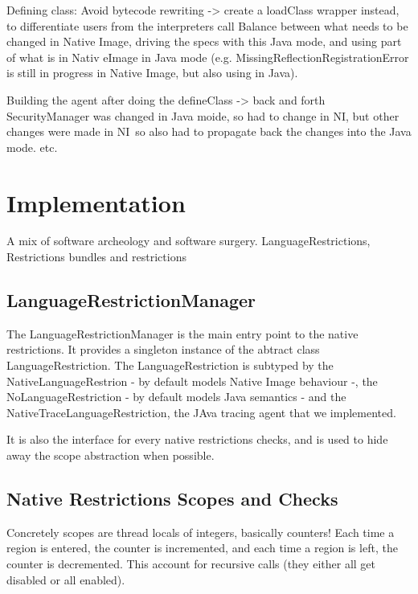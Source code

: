 Defining class: Avoid bytecode rewriting -> create a loadClass wrapper instead, to differentiate users from the interpreters call
Balance between what needs to be changed in Native Image, driving the specs with this Java mode, and using part of what is in Nativ eImage in Java mode (e.g. 
MissingReflectionRegistrationError is still in progress in Native Image, but also using in Java).

Building the agent after doing the defineClass -> back and forth
SecurityManager was changed in Java moide, so had to change in NI, but other changes were made in NI so also had to propagate back the changes into the Java mode.
etc.


\chapter{Implementation}
A mix of software archeology and software surgery.
LanguageRestrictions, Restrictions bundles and restrictions


\section{LanguageRestrictionManager}
The LanguageRestrictionManager is the main entry point to the native restrictions. It provides a singleton instance of the abtract class LanguageRestriction.
The LanguageRestriction is subtyped by the NativeLanguageRestrion - by default models Native Image behaviour -, the NoLanguageRestriction - by default models Java semantics - and the NativeTraceLanguageRestriction, the JAva tracing agent that we implemented. 

It is also the interface for every native restrictions checks, and is used to hide away the scope abstraction when possible.

\section{Native Restrictions Scopes and Checks}
Concretely scopes are thread locals of integers, basically counters!
Each time a region is entered, the counter is incremented, and each time a region is left, the counter is decremented. This account for recursive calls (they either all get disabled or all enabled).

